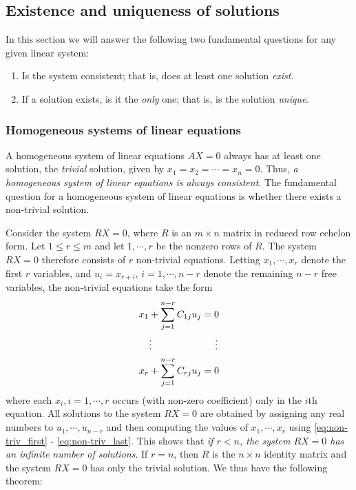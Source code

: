 \documentclass[12pt,letterpaper,reqno]{article}
\numberwithin{equation}{section}
\newcommand{\ti}[1]{\textit{#1}}
\begin{document}
\subsection{Existence and uniqueness of solutions}
In this section we will answer the following two fundamental questions for any given linear system:
\begin{enumerate}
	\item Is the system consistent; that is, does at least one solution \ti{exist}.
	\item If a solution exists, is it the \ti{only} one; that is, is the solution \ti{unique}.
\end{enumerate}
\subsubsection{Homogeneous systems of linear equations}
A homogeneous system of linear equations $AX=0$ always has at least one solution, the \ti{trivial} solution, given by $x_1=x_2=\cdots=x_n=0$. Thus, \ti{a homogeneous system of linear equations is always consistent}. The fundamental question for a homogeneous system of linear equations is whether there exists a non-trivial solution.

Consider the system $RX=0$, where $R$ is an $m \times n$ matrix in reduced row echelon form. Let $1 \leq r \leq m$ and let $1,\cdots,r$ be the nonzero rows of $R$. The system $RX=0$ therefore consists of $r$ non-trivial equations. Letting $x_1,\cdots,x_r$ denote the first $r$ variables, and $u_i=x_{r+i}$, $i=1,\cdots,n-r$ denote the remaining $n-r$ free variables, the non-trivial equations take the form
\begin{align}
		x_1+\sum_{j=1}^{n-r}C_{1j}u_j&=0 \label{eq:non-triv_first} \\
		\vdots \hspace{1.8cm}& \hspace{0.5cm}\vdots \\
		x_r+\sum_{j=1}^{n-r}C_{rj}u_j&=0 \label{eq:non-triv_last}
	\end{align}
where each $x_i, i=1,\cdots,r$ occurs (with non-zero coefficient) only in the $i$th equation. All solutions to the system $RX=0$ are obtained by assigning any real numbers to $u_1,\cdots, u_{n-r}$ and then computing the values of $x_1,\cdots, x_r$ using \eqref{eq:non-triv_first} - \eqref{eq:non-triv_last}. This shows that \ti{if $r<n$, the system $RX=0$ has an infinite number of solutions}. If $r=n$, then $R$ is the $n \times n$ identity matrix and the system $RX=0$ has only the trivial solution. We thus have the following theorem:
\end{document}
